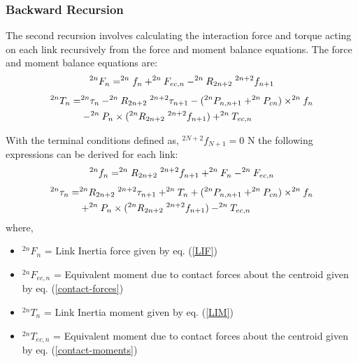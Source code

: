 \documentclass[a4paper,12pt]{report}
\begin{document}
\subsubsection{Backward Recursion}
The second recursion involves calculating the interaction force and torque acting on each link recursively from the force and moment balance equations. The force and moment balance equations are:
\begin{equation*}
^{2n}F_{n} = ^{2n}f_{n} + ^{2n}F_{ec,n} - ^{2n}R_{2n+2} \hspace{1mm} ^{2n+2}f_{n+1}
\end{equation*}
\begin{equation*}
\begin{aligned}
^{2n}T_{n} = &^{2n}\tau_{n} - ^{2n}R_{2n+2} \hspace{1mm} ^{2n+2}\tau_{n+1} 
- (^{2n}P_{n,n+1}+^{2n}P_{cn}) \times ^{2n}f_{n} \\&- ^{2n}P_{n} \times (^{2n}R_{2n+2}\hspace{1mm}^{2n+2}f_{n+1}) + ^{2n}T_{ec,n}
\end{aligned}
\end{equation*}

With the terminal conditions defined as, $^{2N+2}f_{N+1}=0$ N the following expressions can be derived for each link:
\begin{equation}
^{2n}f_{n} = ^{2n}R_{2n+2} \hspace{1mm} ^{2n+2}f_{n+1} + ^{2n}F_{n} - ^{2n}F_{ec,n}
\end{equation}
\begin{equation}
\label{inverse-dynamic-relationship}
\begin{aligned}
^{2n}\tau_{n} = &^{2n}R_{2n+2} \hspace{1mm} ^{2n+2}\tau_{n+1} + ^{2n}T_{n}
+ (^{2n}P_{n,n+1}+^{2n}P_{cn}) \times ^{2n}f_{n} \\&+ ^{2n}P_{n} \times (^{2n}R_{2n+2}\hspace{1mm}^{2n+2}f_{n+1}) - ^{2n}T_{ec,n}
\end{aligned}
\end{equation}
where,
\begin{itemize}
	\renewcommand\labelitemi{--}
	\item $^{2n}F_{n}$ = Link Inertia force given by eq. (\ref{LIF})
	\item $^{2n}F_{ec,n}$ = Equivalent moment due to contact forces about the centroid given by eq. (\ref{contact-forces})
	\item $^{2n}T_{n}$ = Link Inertia moment given by eq. (\ref{LIM})
	\item $^{2n}T_{ec,n}$ = Equivalent moment due to contact forces about the centroid given by eq. (\ref{contact-moments})
\end{itemize}
\end{document}
